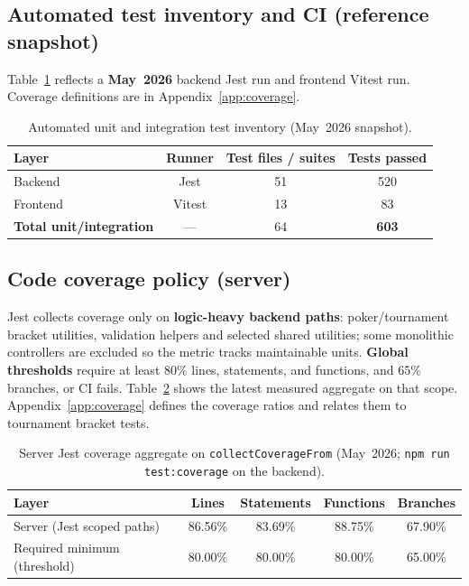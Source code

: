 \documentclass[11pt,a4paper]{article}
\begin{document}
\subsection{Automated test inventory and CI (reference snapshot)}

Table~\ref{tab:tests} reflects a \textbf{May~2026} backend Jest run and frontend Vitest run. Coverage definitions are in Appendix~\ref{app:coverage}.

\begin{table}[htbp]
\centering
\small
\begin{tabular}{@{}lccc@{}}
\toprule
Layer & Runner & Test files / suites & Tests passed \\
\midrule
Backend & Jest & 51 & 520 \\
Frontend & Vitest & 13 & 83 \\
\midrule
\textbf{Total unit/integration} & --- & 64 & \textbf{603} \\
\bottomrule
\end{tabular}
\caption{Automated unit and integration test inventory (May~2026 snapshot).}\label{tab:tests}
\end{table}

\subsection{Code coverage policy (server)}

Jest collects coverage only on \textbf{logic-heavy backend paths}: poker/tournament bracket utilities, validation helpers and selected shared utilities; some monolithic controllers are excluded so the metric tracks maintainable units. \textbf{Global thresholds} require at least $80\%$ lines, statements, and functions, and $65\%$ branches, or CI fails. Table~\ref{tab:coverage} shows the latest measured aggregate on that scope. Appendix~\ref{app:coverage} defines the coverage ratios and relates them to tournament bracket tests.

\begin{table}[htbp]
\centering
\small
\begin{tabular}{@{}lcccc@{}}
\toprule
Layer & Lines & Statements & Functions & Branches \\
\midrule
Server (Jest scoped paths) & 86.56\% & 83.69\% & 88.75\% & 67.90\% \\
\midrule
Required minimum (threshold) & 80.00\% & 80.00\% & 80.00\% & 65.00\% \\
\bottomrule
\end{tabular}
\caption{Server Jest coverage aggregate on \texttt{collectCoverageFrom} (May~2026; \texttt{npm run test:coverage} on the backend).}\label{tab:coverage}
\end{table}
\end{document}
